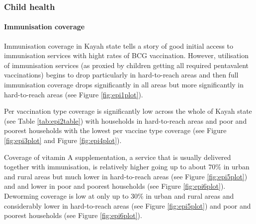 \documentclass[12pt,a4paper]{article}
\let\oldparagraph\paragraph
\renewcommand{\paragraph}[1]{\oldparagraph{#1}\mbox{}}
\begin{document}
\hypertarget{chealth-results}{%
\subsubsection{Child health}\label{chealth-results}}

\hypertarget{epi-results}{%
\paragraph{Immunisation coverage}\label{epi-results}}

Immunisation coverage in Kayah state tells a story of good initial access to immunisation services with hight rates of BCG vaccination. However, utilisation of immunisation services (as proxied by children getting all required pentavalent vaccinations) begins to drop particularly in hard-to-reach areas and then full immunisation coverage drops significantly in all areas but more significantly in hard-to-reach areas (see Figure \ref{fig:epi1plot}).

Per vaccination type coverage is significantly low across the whole of Kayah state (see Table \ref{tab:epi2table}) with households in hard-to-reach areas and poor and poorest households with the lowest per vaccine type coverage (see Figure \ref{fig:epi3plot} and Figure \ref{fig:epi4plot}).

Coverage of vitamin A supplementation, a service that is usually delivered together with immunisation, is relatively higher going up to about 70\% in urban and rural areas but much lower in hard-to-reach areas (see Figure \ref{fig:epi5plot}) and and lower in poor and poorest households (see Figure \ref{fig:epi6plot}). Deworming coverage is low at only up to 30\% in urban and rural areas and considerably lower in hard-to-reach areas (see Figure \ref{fig:epi5plot}) and poor and poorest households (see Figure \ref{fig:epi6plot}).
\end{document}

